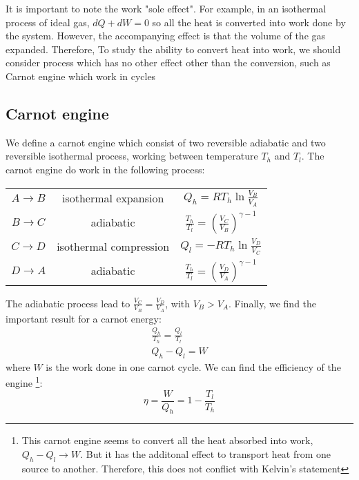 \documentclass{article}
\newcommand{\dbar}{d}
\begin{document}
It is important to note the work "sole effect". For example, in an isothermal process of ideal gas, 
$\dbar Q + \dbar W = 0$ so all the heat is converted into work done by the system. However, the 
accompanying effect is that the volume of the gas expanded. 
Therefore, To study the ability to convert heat into work, we should consider process which has no 
other effect other than the conversion, such as Carnot engine which work in cycles

\subsection*{Carnot engine}
We define a carnot engine which consist of two reversible adiabatic and two reversible 
isothermal process, working between temperature $T_h$ and $T_l$. The carnot engine do work
in the following process:

\begin{table*}
    \centering
    \begin{tabular}{ccc}
        $ A \to B $ & isothermal expansion & $Q_h = RT_h \ln \frac{V_B}{V_A}$ \\
        $ B \to C $ & adiabatic & $ \frac{T_h}{T_l} = \left( \frac{V_C}{V_B} \right) ^ {\gamma-1} $ \\
        $ C \to D $ & isothermal compression & $Q_l = - RT_h \ln \frac{V_D}{V_C}$ \\
        $ D \to A $ & adiabatic & $ \frac{T_h}{T_l} = \left( \frac{V_D}{V_A} \right) ^ {\gamma-1}$ \\
    \end{tabular}
\end{table*}

The adiabatic process lead to $\frac{V_C}{V_B} = \frac{V_D}{V_A} $, with $V_B > V_A$. Finally, we 
find the important result for a carnot energy:
\begin{gather}
    \frac{Q_h}{T_h} = \frac{Q_l}{T_l} \\
    Q_h - Q_l = W
\end{gather}
where $W$ is the work done in one carnot cycle. We can find the efficiency of the engine
\footnote{This carnot engine seems to convert all the heat absorbed into work, $Q_h - Q_l \to W$. But
it has the additonal effect to transport heat from one source to another. Therefore, this does not 
conflict with Kelvin's statement}:
\begin{equation}
    \eta = \frac{W}{Q_h} = 1 - \frac{T_l}{T_h}
\end{equation}
\end{document}
